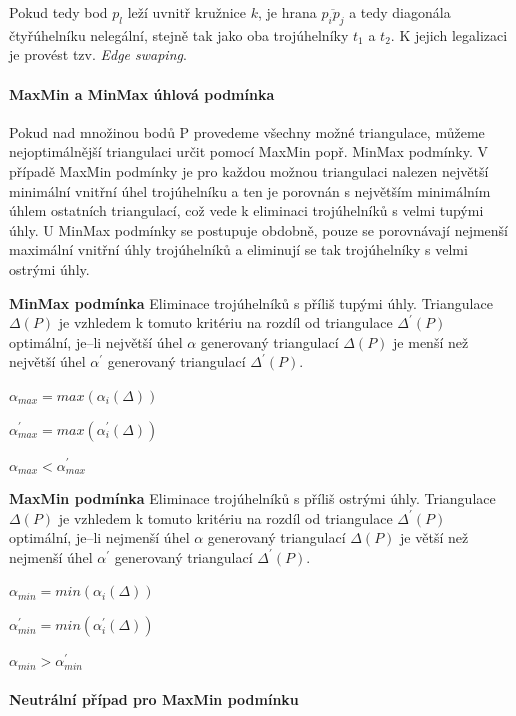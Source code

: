 \documentclass[12pt,a4paper]{article}
\begin{document}
Pokud tedy bod $p_l$ leží uvnitř kružnice $k$, je hrana
$\overline{p_ip_j}$ a tedy diagonála čtyřúhelníku nelegální, stejně
tak jako oba trojúhelníky $t_1$ a $t_2$. K jejich legalizaci je
provést tzv. \emph{Edge swaping}.

\paragraph{MaxMin a MinMax úhlová podmínka}

Pokud nad množinou bodů P provedeme všechny možné triangulace, můžeme
nejoptimálnější triangulaci určit pomocí MaxMin popř. MinMax
podmínky. V případě MaxMin podmínky je pro každou možnou triangulaci
nalezen největší minimální vnitřní úhel trojúhelníku a ten je porovnán
s největším minimálním úhlem ostatních triangulací, což vede k
eliminaci trojúhelníků s velmi tupými úhly. U MinMax podmínky se
postupuje obdobně, pouze se porovnávají nejmenší maximální vnitřní
úhly trojúhelníků a eliminují se tak trojúhelníky s velmi ostrými
úhly.

\newpage
{\bf MinMax podmínka}\cite{TB1} Eliminace trojúhelníků s příliš tupými
úhly. Triangulace $\Delta(P)$ je vzhledem k tomuto kritériu na rozdíl
od triangulace $\Delta^{'}(P)$ optimální, je–li největší úhel $\alpha$
generovaný triangulací $\Delta(P)$ je menší než největší úhel
$\alpha^{'}$ generovaný triangulací $\Delta^{'}(P)$.
\begin{center}
$\alpha_{max} = max(\alpha_i(\Delta))$

$\alpha^{'}_{max} = max(\alpha_i^{'}(\Delta))$

$\alpha_{max} < \alpha^{'}_{max}$
\end{center}

\bigskip

{\bf MaxMin podmínka} Eliminace trojúhelníků s příliš ostrými
úhly. Triangulace $\Delta(P)$ je vzhledem k tomuto kritériu na rozdíl
od triangulace $\Delta^{'}(P)$ optimální, je–li nejmenší úhel $\alpha$
generovaný triangulací $\Delta(P)$ je větší než nejmenší úhel
$\alpha^{'}$ generovaný triangulací $\Delta^{'}(P)$.
\begin{center}
$\alpha_{min} = min(\alpha_i(\Delta))$

$\alpha^{'}_{min} = min(\alpha_i^{'}(\Delta))$

$\alpha_{min} > \alpha^{'}_{min}$
\end{center}

\paragraph{Neutrální případ pro MaxMin podmínku}
\end{document}
